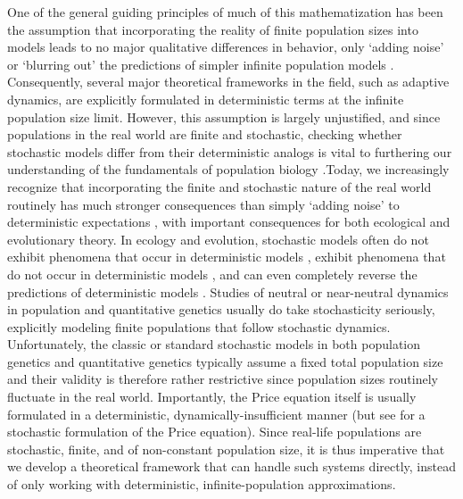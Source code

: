 One of the general guiding principles of much of this mathematization has been the assumption that incorporating the reality of finite population sizes into models leads to no major qualitative differences in behavior, only `adding noise' or `blurring out' the predictions of simpler infinite population models \citep{page_unifying_2002}. Consequently, several major theoretical frameworks in the field, such as adaptive dynamics, are explicitly formulated in deterministic terms at the infinite population size limit. However, this assumption is largely unjustified, and since populations in the real world are finite and stochastic, checking whether stochastic models differ from their deterministic analogs is vital to furthering our understanding of the fundamentals of population biology \citep{hastings_transients_2004, coulson_skeletons_2004, shoemaker_integrating_2020}.Today, we increasingly recognize that incorporating the finite and stochastic nature of the real world routinely has much stronger consequences than simply `adding noise' to deterministic expectations \citep{boettiger_noise_2018}, with important consequences for both ecological \citep{schreiber_does_2022} and evolutionary \citep{delong_stochasticity_2023} theory. In ecology and evolution, stochastic models often do not exhibit phenomena that occur in deterministic models \citep{proulx_what_2005, johansson_will_2006, claessen_delayed_2007,  wakano_evolutionary_2013, debarre_evolutionary_2016, johnson_two-dimensional_2021}, exhibit phenomena that do not occur in deterministic models \citep{rogers_demographic_2012, rogers_spontaneous_2012, rogers_modes_2015, veller_drift-induced_2017, delong_stochasticity_2023}, and can even completely reverse the predictions of deterministic models \citep{houchmandzadeh_selection_2012,houchmandzadeh_fluctuation_2015,constable_demographic_2016,mcleod_social_2019}. Studies of neutral or near-neutral dynamics in population and quantitative genetics usually do take stochasticity seriously, explicitly modeling finite populations that follow stochastic dynamics. Unfortunately, the classic or standard stochastic models in both population genetics \citep{fisher_genetical_1930,wright_evolution_1931, moran_random_1958} and quantitative genetics \citep{crow_introduction_1970, lande_natural_1976} typically assume a fixed total population size and their validity is therefore rather restrictive since population sizes routinely fluctuate in the real world. Importantly, the Price equation itself is usually formulated in a deterministic, dynamically-insufficient manner (but see \cite{rice_stochastic_2008} for a stochastic formulation of the Price equation). Since real-life populations are stochastic, finite, and of non-constant population size, it is thus imperative that we develop a theoretical framework that can handle such systems directly, instead of only working with deterministic, infinite-population approximations.\\
